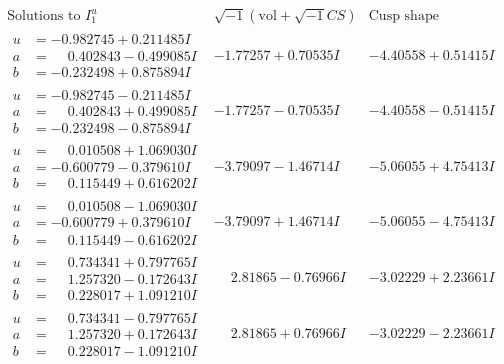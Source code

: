 \documentclass[1p]{elsarticle_modified}
\theoremstyle{definition}
\newcommand{\I}{\sqrt{-1}}
\begin{document}
$$\begin{array}{c|c|c}  
\text{Solutions to }I^u_{1}& \I (\text{vol} + \sqrt{-1}CS) & \text{Cusp shape}\\
 \hline 
\begin{aligned}
u &= -0.982745 + 0.211485 I \\
a &= \phantom{-}0.402843 - 0.499085 I \\
b &= -0.232498 + 0.875894 I\end{aligned}
 & -1.77257 + 0.70535 I & -4.40558 + 0.51415 I \\ \hline\begin{aligned}
u &= -0.982745 - 0.211485 I \\
a &= \phantom{-}0.402843 + 0.499085 I \\
b &= -0.232498 - 0.875894 I\end{aligned}
 & -1.77257 - 0.70535 I & -4.40558 - 0.51415 I \\ \hline\begin{aligned}
u &= \phantom{-}0.010508 + 1.069030 I \\
a &= -0.600779 - 0.379610 I \\
b &= \phantom{-}0.115449 + 0.616202 I\end{aligned}
 & -3.79097 - 1.46714 I & -5.06055 + 4.75413 I \\ \hline\begin{aligned}
u &= \phantom{-}0.010508 - 1.069030 I \\
a &= -0.600779 + 0.379610 I \\
b &= \phantom{-}0.115449 - 0.616202 I\end{aligned}
 & -3.79097 + 1.46714 I & -5.06055 - 4.75413 I \\ \hline\begin{aligned}
u &= \phantom{-}0.734341 + 0.797765 I \\
a &= \phantom{-}1.257320 - 0.172643 I \\
b &= \phantom{-}0.228017 + 1.091210 I\end{aligned}
 & \phantom{-}2.81865 - 0.76966 I & -3.02229 + 2.23661 I \\ \hline\begin{aligned}
u &= \phantom{-}0.734341 - 0.797765 I \\
a &= \phantom{-}1.257320 + 0.172643 I \\
b &= \phantom{-}0.228017 - 1.091210 I\end{aligned}
 & \phantom{-}2.81865 + 0.76966 I & -3.02229 - 2.23661 I \\ \hline\begin{aligned}

\end{aligned}
\end{array}$$
\end{document}
